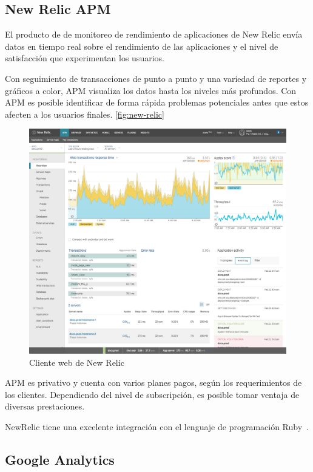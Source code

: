 \subsection{New Relic APM}

El producto de  de monitoreo de rendimiento de aplicaciones de New
Relic envía datos en tiempo real sobre el rendimiento de las aplicaciones  y
el nivel de satisfacción que experimentan los usuarios.

Con seguimiento de transacciones de punto a punto y una variedad de reportes y
gráficos a color, APM visualiza los datos hasta los niveles más profundos. Con
APM es posible identificar de forma rápida problemas potenciales antes que
estos afecten a los usuarios finales. \autoref{fig:new-relic}


\begin{figure}
  \includegraphics[width=\linewidth]{src/images/anexos/newrelic.png}
  \caption{Cliente web de New Relic}
  \label{fig:new-relic}
\end{figure}


APM es  privativo y cuenta con varios planes pagos, según los
requerimientos de los clientes. Dependiendo del nivel de subscripción, es
posible tomar ventaja de diversas prestaciones.

NewRelic tiene una excelente integración con el lenguaje de programación
Ruby~\cite{newrelic}.

\subsection{Google Analytics}

